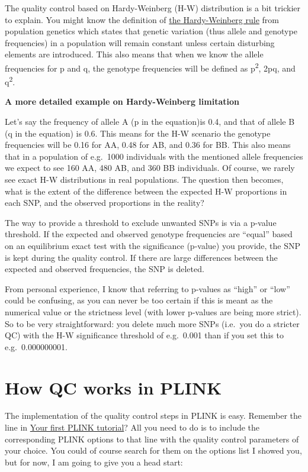 \documentclass[]{book}
\begin{document}
The quality control based on Hardy-Weinberg (H-W) distribution is a bit
trickier to explain. You might know the definition of
\href{https://www.khanacademy.org/science/biology/her/heredity-and-genetics/a/hardy-weinberg-mechanisms-of-evolution}{the
Hardy-Weinberg rule} from population genetics which states that genetic
variation (thus allele and genotype frequencies) in a population will
remain constant unless certain disturbing elements are introduced. This
also means that when we know the allele frequencies for p and q, the
genotype frequencies will be defined as p\textsuperscript{2}, 2pq, and
q\textsuperscript{2}.

\textbf{A more detailed example on Hardy-Weinberg limitation}

Let's say the frequency of allele A (p in the equation)is 0.4, and that
of allele B (q in the equation) is 0.6. This means for the H-W scenario
the genotype frequencies will be 0.16 for AA, 0.48 for AB, and 0.36 for
BB. This also means that in a population of e.g.~1000 individuals with
the mentioned allele frequencies we expect to see 160 AA, 480 AB, and
360 BB individuals. Of course, we rarely see exact H-W distributions in
real populations. The question then becomes, what is the extent of the
difference between the expected H-W proportions in each SNP, and the
observed proportions in the reality?

The way to provide a threshold to exclude unwanted SNPs is via a p-value
threshold. If the expected and observed genotype frequencies are
``equal'' based on an equilibrium exact test with the significance
(p-value) you provide, the SNP is kept during the quality control. If
there are large differences between the expected and observed
frequencies, the SNP is deleted.

From personal experience, I know that referring to p-values as ``high''
or ``low'' could be confusing, as you can never be too certain if this
is meant as the numerical value or the strictness level (with lower
p-values are being more strict). So to be very straightforward: you
delete much more SNPs (i.e.~you do a stricter QC) with the H-W
significance threshold of e.g.~0.001 than if you set this to
e.g.~0.000000001.

\section{How QC works in PLINK}\label{how-qc-works-in-plink}

The implementation of the quality control steps in PLINK is easy.
Remember the line in \protect\hyperlink{your-first-plink-tutorial}{Your
first PLINK tutorial}? All you need to do is to include the
corresponding PLINK options to that line with the quality control
parameters of your choice. You could of course search for them on the
options list I showed you, but for now, I am going to give you a head
start:
\end{document}
